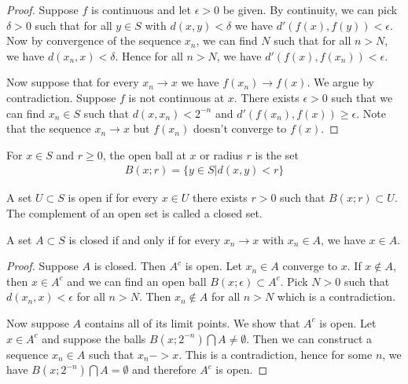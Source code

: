 \begin{proof}
Suppose $f$ is continuous and let $\epsilon > 0$ be given.  By
continuity, we can pick $\delta > 0$ such that for all $y \in S$
with $d(x,y) < \delta$ we have $d'(f(x), f(y)) < \epsilon$.  Now by
convergence of the sequence $x_n$, we can find $N$ such that for all
$n>N$, we have $d(x_n,x) < \delta$.  Hence for all $n > N$, we have
$d'(f(x), f(x_n)) < \epsilon$.

Now suppose that for every $x_n \to x$ we have $f(x_n) \to f(x)$.  We
argue by contradiction.  Suppose $f$ is not continuous at $x$.  There
exists $\epsilon > 0$ such that we can find $x_n \in S$ such that
$d(x,x_n) < 2 ^ {-n}$ and $d'(f(x_n), f(x)) \geq \epsilon$.  Note that
the sequence $x_n \to x$ but $f(x_n)$ doesn't converge to $f(x)$.
\end{proof}
\begin{defn}For $x\in S$ and $r \geq 0$, the open ball at $x$ or
  radius $r$ is the set
\begin{align*}
B(x;r) = \{y\in S | d(x,y) < r \}
\end{align*}
\end{defn}
\begin{defn}A set $U \subset S$ is open if for every $x \in U$ there
  exists $r>0$ such that $B(x;r) \subset U$.  The complement of an
  open set is called a closed set.
\end{defn}
\begin{lem}A set $A \subset S$ is closed if and only if for every $x_n
  \to x$ with $x_n \in A$, we have $x \in A$.
\end{lem}
\begin{proof}
Suppose $A$ is closed.  Then $A^c$ is open.  Let $x_n \in A$ converge
to $x$.  If $x \notin A$, then $x \in A^c$ and we can find an open
ball $B(x;\epsilon) \subset A^c$.  Pick $N>0$ such that $d(x_n, x) <
\epsilon$ for all $n > N$.  Then $x_n \notin A$ for all $n>N$ which is
a contradiction.

Now suppose $A$ contains all of its limit points.  We show that $A^c$
is open.  Let $x\in A^c$ and suppose the balls $B(x;2^{-n}) \bigcap A
\ne \emptyset$.  Then we can construct a sequence $x_n \in A$ such
that $x_n ->x$.  This is a contradiction, hence for some $n$, we have 
$B(x;2^{-n}) \bigcap A = \emptyset$ and therefore $A^c$ is open.
\end{proof}

